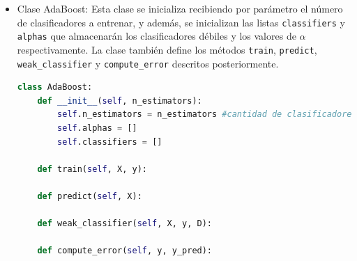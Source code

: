 \documentclass{article}
\begin{document}
    \begin{itemize}
        \item Clase AdaBoost:
        \newline
        Esta clase se inicializa recibiendo por parámetro el número de clasificadores a entrenar,
        y además, se inicializan las listas  \texttt{classifiers} y \texttt{alphas}
        que almacenarán los clasificadores débiles y los valores de $\alpha$ respectivamente.
        La clase también define los métodos \texttt{train}, \texttt{predict}, \texttt{weak\_classifier} y \texttt{compute\_error} descritos posteriormente.

        \begin{lstlisting}[language=Python, caption={AdaBoost class}, label={lst:adaboost_class}]
class AdaBoost:
    def __init__(self, n_estimators):
        self.n_estimators = n_estimators #cantidad de clasificadores
        self.alphas = []
        self.classifiers = []

    def train(self, X, y):

    def predict(self, X):

    def weak_classifier(self, X, y, D):

    def compute_error(self, y, y_pred):
        \end{lstlisting}


\end{itemize}
\end{document}
